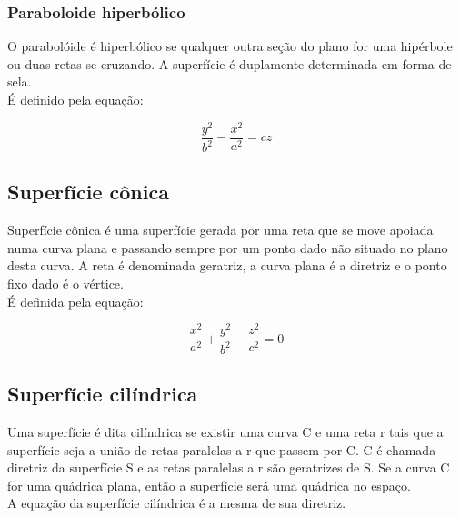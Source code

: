 \documentclass[12 pt, a4 paper]{article}
\begin{document}
\subsubsection{Paraboloide hiperbólico}
O parabolóide é hiperbólico se qualquer outra seção do plano for uma hipérbole ou duas retas se cruzando. A superfície é duplamente determinada em forma de sela.
\\É definido pela equação:
\begin{center}

\begin{equation}
\dfrac{y^2}{b^2} - \dfrac{x^2}{a^2} = cz
\end{equation}

\end{center}

\subsection{Superfície cônica}
Superfície cônica é uma superfície gerada por uma reta que se move apoiada numa curva plana e passando sempre por um ponto dado não situado no plano desta curva. A reta é denominada geratriz, a curva plana é a diretriz e o ponto fixo dado é o vértice.
\\É definida pela equação:
\begin{center}

\begin{equation}
\dfrac{x^2}{a^2} + \dfrac{y^2}{b^2} - \dfrac{z^2}{c^2} = 0    
\end{equation}

\end{center}

\subsection{Superfície cilíndrica}
Uma superfície é dita cilíndrica se existir uma curva C e uma reta r tais que a superfície seja a união de retas paralelas a r que passem por C. C é chamada diretriz da superfície S e as retas paralelas a r são geratrizes de S.
Se a curva C for uma quádrica plana, então a superfície será uma quádrica no espaço.
\\A equação da superfície cilíndrica é a mesma de sua diretriz.
\end{document}
